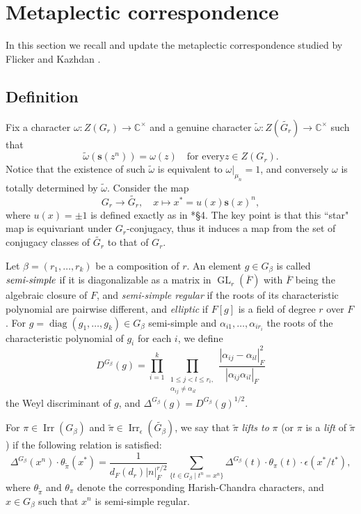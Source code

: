 \documentclass{amsart}
\numberwithin{equation}{section}
\newcommand{\abs}[1]{\left|#1\right|_{F}}
\newcommand{\rest}{\lvert}
\newcommand{\mrgl}{\operatorname{GL}}
\newcommand{\mrdiag}{\operatorname{diag}}
\newcommand{\mrirr}{\operatorname{Irr}}
\newcommand{\mbc}{\mathbb{C}}
\newcommand{\dF}[1]{d_{F}(#1)}
\newcommand{\bs}[1]{\boldsymbol{#1}}
\newcommand{\wt}[1]{\widetilde{#1}}
\begin{document}
	\section{Metaplectic correspondence}
	
	In this section we recall and update the metaplectic correspondence studied by Flicker and Kazhdan \cite{flicker1986metaplectic}.
	
	\subsection{Definition}\label{subsectionMCdefinition}
	
	Fix a character $\omega:Z(G_{r})\rightarrow\mbc^{\times}$ and a genuine character $\wt{\omega}:Z(\wt{G_{r}})\rightarrow\mbc^{\times}$ such that 
	\begin{equation}\label{eqomegawtomega}
		\wt{\omega}(\bs{s}(z^{n}))=\omega(z)\quad\text{for every}z\in Z(G_{r}).
	\end{equation}
	Notice that the existence of such $\wt{\omega}$ is equivalent to $\omega\rest_{\mu_{n}}=1$, and conversely $\omega$ is totally determined by $\wt{\omega}$.
	Consider the map
	$$G_{r}\rightarrow\wt{G_{r}},\quad x\mapsto x^{*}=u(x) \bs{s}(x)^{n},$$
	where $u(x)=\pm1$ is defined exactly as in \cite{flicker1986metaplectic}*{\S 4}. The key point is that this ``star" map is equivariant under $G_{r}$-conjugacy, thus it induces a map from the set of conjugacy classes of $\wt{G_{r}}$ to that of $G_{r}$.
	
	Let $\beta=(r_{1},\dots,r_{k})$ be a composition of $r$. An element $g\in G_{\beta}$ is called $\emph{semi-simple}$ if it is diagonalizable as a matrix in $\mrgl_{r}(\overline{F})$ with $\overline{F}$ being the algebraic closure of $F$, and \emph{semi-simple regular} if the roots of its characteristic polynomial are pairwise different, and \emph{elliptic} if $F[g]$ is a field of degree $r$ over $F$. For $g=\mrdiag(g_{1},\dots,g_{k})\in G_{\beta}$ semi-simple and $\alpha_{i1},\dots,\alpha_{ir_{i}}$ the roots of the characteristic polynomial of $g_{i}$ for each $i$, we define
	$$D^{G_{\beta}}(g)=\prod_{i=1}^{k}\prod_{\substack{1\leq j<l\leq r_{i},\\ \alpha_{ij}\neq\alpha_{il}}}\frac{\abs{\alpha_{ij}-\alpha_{il}}^{2}}{\abs{\alpha_{ij}\alpha_{il}}}$$
	the Weyl discriminant of $g$, and
	$\Delta^{G_{\beta}}(g)=D^{G_{\beta}}(g)^{1/2}.$
	
	For $\pi\in\mrirr(G_{\beta})$ and $\wt{\pi}\in\mrirr_{\epsilon}(\wt{G_{\beta}})$, we say that $\wt{\pi}$ \emph{lifts to} $\pi$ (or $\pi$ is a \emph{lift} of $\wt{\pi}$) if the following relation is satisfied:
	\begin{equation}\label{eqmccorr}
		\Delta^{G_{\beta}}(x^{n})\cdot\theta_{\wt{\pi}}(x^{*})=\frac{1}{\dF{d_{r}}\abs{n}^{r/2}}\sum_{\{t\in G_{\beta} \mid t^{n}=x^{n}\}}\Delta^{G_{\beta}}(t)\cdot\theta_{\pi}(t)\cdot\epsilon(x^{*}/t^{*}),
	\end{equation}
	where $\theta_{\wt{\pi}}$ and $\theta_{\pi}$ denote the corresponding Harish-Chandra characters, and $x\in G_{\beta}$ such that $x^{n}$ is semi-simple regular. 
	
\end{document}
